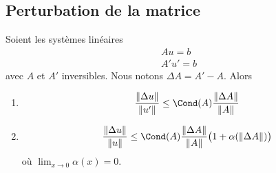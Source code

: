 \subsection{Perturbation de la matrice}

\begin{proposition}
    Soient les systèmes linéaires
    \begin{subequations}
        \begin{align}
            Au=b\\
            A'u'=b
        \end{align}
    \end{subequations}
    avec \( A\) et \( A'\) inversibles. Nous notons \( \Delta A=A'-A\). Alors
    \begin{enumerate}
        \item       \label{ITEMooJMTKooSEBavB}
            \begin{equation}
                \frac{ \| \Delta u \| }{ \| u' \| }\leq \Cond(A)\frac{ \| \Delta A \| }{ \| A \| }
            \end{equation}
        \item
            \begin{equation}
                \frac{ \| \Delta u \| }{ \| u \| }\leq \Cond(A)\frac{ \| \Delta A \| }{ \| A \| }\big( 1+\alpha(\| \Delta A \|) \big)
            \end{equation}
            où \( \lim_{x\to 0} \alpha(x)=0\).
    \end{enumerate}
\end{proposition}

